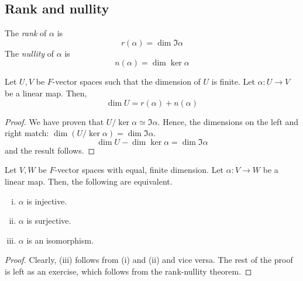 \subsection{Rank and nullity}
\begin{definition}
	The \textit{rank} of \( \alpha \) is
	\[
		r(\alpha) = \dim\Im \alpha
	\]
	The \textit{nullity} of \( \alpha \) is
	\[
		n(\alpha) = \dim\ker \alpha
	\]
\end{definition}
\begin{theorem}
	Let \( U, V \) be \( F \)-vector spaces such that the dimension of \( U \) is finite.
	Let \( \alpha \colon U \to V \) be a linear map.
	Then,
	\[
		\dim U = r(\alpha) + n(\alpha)
	\]
\end{theorem}
\begin{proof}
	We have proven that \( U / \ker \alpha \simeq \Im \alpha \).
	Hence, the dimensions on the left and right match: \( \dim (U/\ker\alpha) = \dim \Im \alpha \).
	\[
		\dim U - \dim \ker \alpha = \dim \Im \alpha
	\]
	and the result follows.
\end{proof}
\begin{lemma}
	Let \( V, W \) be \( F \)-vector spaces with equal, finite dimension.
	Let \( \alpha \colon V \to W \) be a linear map.
	Then, the following are equivalent.
	\begin{enumerate}[(i)]
		\item \( \alpha \) is injective.
		\item \( \alpha \) is surjective.
		\item \( \alpha \) is an isomorphism.
	\end{enumerate}
\end{lemma}
\begin{proof}
	Clearly, (iii) follows from (i) and (ii) and vice versa.
	The rest of the proof is left as an exercise, which follows from the rank-nullity theorem.
\end{proof}
